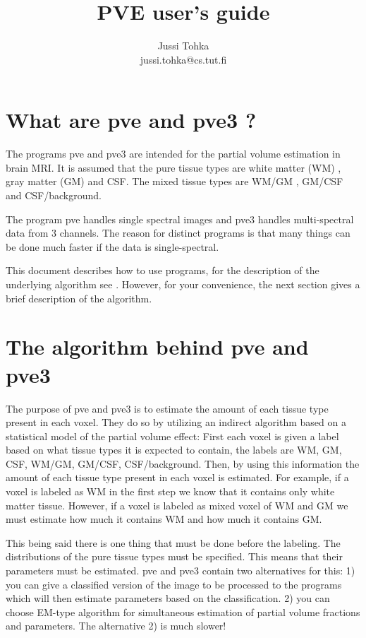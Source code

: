 \documentclass{article}
\title{PVE user's guide}
\author{Jussi Tohka \\ jussi.tohka@cs.tut.fi}
\begin{document}
\maketitle

\section{What are pve and pve3 ?}
The programs pve and pve3 are intended for the partial volume estimation
in brain MRI.  It is assumed that the pure tissue 
types are white matter (WM) , 
gray matter (GM) and CSF. The mixed tissue types are WM/GM , GM/CSF
and CSF/background. 

The program pve handles single spectral images and pve3 handles
multi-spectral data from 3 channels. The reason for distinct programs is
that many things can be done much faster if the data is single-spectral.

This document describes how to use programs, for the description of
the underlying algorithm see \cite{}. However, for your convenience,
the next section gives a brief description of the algorithm.

\section{The algorithm behind pve and pve3}
The purpose of pve and pve3 is to estimate the amount of each tissue
type present in each voxel. They do so by utilizing an indirect
algorithm based on a statistical model of the partial volume effect: 
First each voxel is given a label based on what tissue
types it is expected to contain, the labels are WM, GM, CSF, WM/GM, GM/CSF, CSF/background. Then, by using this information the
amount of each tissue type present in each voxel is estimated. For
example, if a voxel is labeled as WM in the first step we know that
it contains only white matter tissue. However, if a voxel is labeled
as mixed voxel of WM and GM we must estimate how much it contains WM
and how much it contains GM.

This being said there is one thing that must be done before the
labeling. The distributions of the pure tissue types must be
specified. This means that their parameters must be estimated. pve and 
pve3 contain two alternatives for this: 1) you can give a classified
version of the image to be processed  to the programs which will
 then estimate parameters based on the classification. 2) you can
choose EM-type algorithm for simultaneous estimation of partial volume 
fractions
and parameters. The alternative 2) is much slower!
\end{document}
